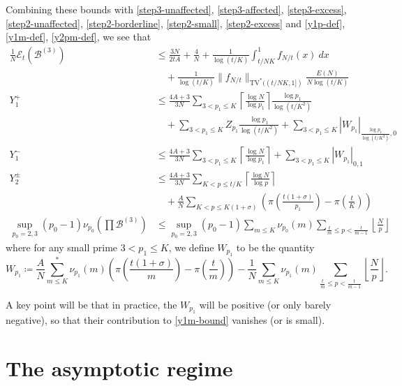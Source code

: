 \documentclass[12pt,a4paper,reqno]{amsart}
\numberwithin{equation}{section}
\theoremstyle{plain}
\theoremstyle{definition}
\newcommand\tuple{{\mathcal B}}
\newcommand\excess{{\mathcal{E}}}
\begin{document}
Combining these bounds with \eqref{step3-unaffected}, \eqref{step3-affected}, \eqref{step3-excess}, \eqref{step2-unaffected}, \eqref{step2-borderline}, \eqref{step2-small}, \eqref{step2-excess} and \eqref{y1p-def}, \eqref{y1m-def}, \eqref{y2pm-def}, we see that
\begin{align}
\frac{1}{N} \excess_t(\tuple^{(3)})
&\leq 
\frac{3N}{2tA} + \frac{4}{N} + \frac{1}{\log(t/K)} \int_{t/NK}^1 f_{N/t}(x)\ dx\nonumber \\
&\quad + \frac{1}{\log(t/K)} \|f_{N/t}\|_{\mathrm{TV}^*((t/NK,1])} \frac{E(N)}{N \log(t/K)} \label{excess-3-bound}\\
Y_1^+ &\leq \frac{4A+3}{3N} \sum_{3 < p_1 \leq K} 
 \left\lceil \frac{\log N}{\log p_1} \right\rceil \frac{\log p_1}{\log (t/K^2)} \nonumber \\
 &\quad + \sum_{3 < p_1 \leq K} Z_{p_1} \frac{\log p_1}{\log(t/K^2)} + \sum_{3 < p_1 \leq K}  |W_{p_1}|_{\frac{\log p_1}{\log (t/K^2)}, 0} \label{y1p-bound}\\
Y_1^- &\leq \frac{4A+3}{3N} \sum_{3 < p_1 \leq K} 
\left\lceil \frac{\log N}{\log p_1} \right\rceil 
+ \sum_{3 < p_1 \leq K}  |W_{p_1}|_{0, 1} \label{y1m-bound} \\
Y^\pm_2 &\leq \frac{4A+3}{3N} \sum_{K < p \leq t/K} \left\lceil \frac{\log N}{\log p} \right\rceil \nonumber \\
&\quad + \frac{A}{N} \sum_{K < p \leq K(1+\sigma)} 
\left(\pi\left(\frac{t(1+\sigma)}{p_1}\right) - \pi\left(\frac{t}{K}\right)\right)
\label{y2pm-bound} \\
\sup_{p_0=2,3} (p_0-1)\nu_{p_0}\left(\prod \tuple^{(3)}\right)  &\leq \sup_{p_0=2,3} (p_0-1) \sum_{m \leq K} \nu_{p_0}(m) \sum_{\frac{t}{m} \leq p < \frac{t}{m-1}} \left\lfloor \frac{N}{p} \right\rfloor
\label{small-bound}
\end{align}
where for any small prime $3 < p_1 \leq K$, we define $W_{p_1}$ to be the quantity
\begin{equation}\label{W-def}
W_{p_1} \coloneqq \frac{A}{N} \sum_{m \leq K}^* \nu_{p_1}(m) \left(\pi\left(\frac{t(1+\sigma)}{m}\right) - \pi\left(\frac{t}{m}\right)\right)
- \frac{1}{N} \sum_{m \leq K} \nu_{p_1}(m) \sum_{\frac{t}{m} \leq p < \frac{t}{m-1}} \left\lfloor \frac{N}{p} \right\rfloor.
\end{equation}

A key point will be that in practice, the $W_{p_1}$ will be positive (or only barely negative), so that their contribution to \eqref{y1m-bound} vanishes (or is small).

\section{The asymptotic regime}
\end{document}
